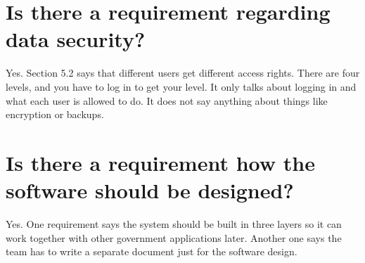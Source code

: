 \documentclass[11pt]{article}
\begin{document}
\section{Is there a requirement regarding data security?}
Yes. Section 5.2 says that different users get different access rights. There are
four levels, and you have to log in to get your level. It only talks about
logging in and what each user is allowed to do. It does not say anything about
things like encryption or backups.

\section{Is there a requirement how the software should be designed?}
Yes. One requirement says the system should be built in three layers so it can
work together with other government applications later. Another one says the team
has to write a separate document just for the software design.
\end{document}
